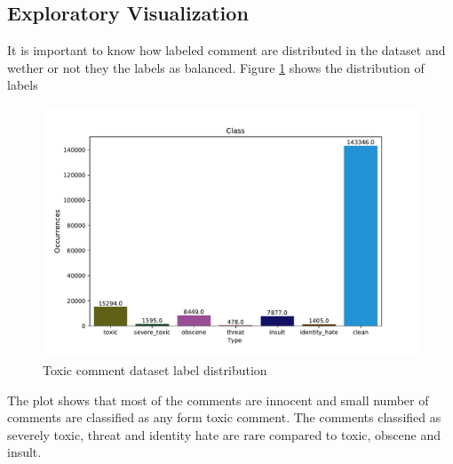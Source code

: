 \documentclass{article}
\begin{document}



    \subsection{Exploratory Visualization}

    It is important to know how labeled comment are distributed in the dataset and wether or not they the labels as balanced. Figure \ref{fig:labels} shows the distribution of labels

    \begin{figure}[!h]
        \centering
        \includegraphics[scale=0.7]{figures/labels.pdf}
        \caption{Toxic comment dataset label distribution}
        \label{fig:labels}
    \end{figure}

    The plot shows that most of the comments are innocent and small number of comments are classified as any form toxic comment. The comments classified as severely toxic, threat and identity hate are rare compared to toxic, obscene and insult.
\end{document}
